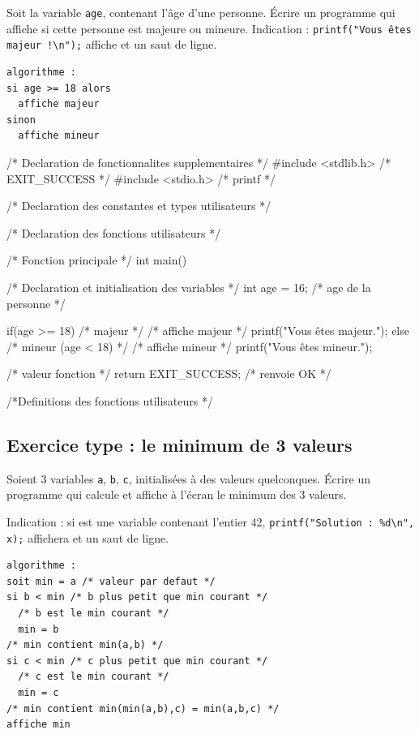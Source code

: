 Soit la variable \verb|age|, contenant l'âge d'une personne. Écrire un
programme qui affiche si cette personne est majeure ou
mineure. Indication : \verb|printf("Vous êtes majeur !\n");| affiche
 et un saut de ligne.

\begin{correction}
\begin{verbatim}
algorithme :
si age >= 18 alors 
  affiche majeur
sinon 
  affiche mineur
\end{verbatim}
\begin{listing}{1}
/* Declaration de fonctionnalites supplementaires */
#include <stdlib.h> /* EXIT_SUCCESS */
#include <stdio.h> /* printf */

/* Declaration des constantes et types utilisateurs */

/* Declaration des fonctions utilisateurs */

/* Fonction principale */
int main()
{
    /* Declaration et initialisation des variables */
    int age = 16; /* age de la personne */

    if(age >= 18) /* majeur */
    {
	/* affiche majeur */
	printf("Vous êtes majeur.\n");
    }
    else /* mineur (age < 18) */
    {
	/* affiche mineur */
	printf("Vous êtes mineur.\n");
    }
    
    /* valeur fonction */
    return EXIT_SUCCESS; /* renvoie OK */
}

/*Definitions des fonctions utilisateurs */
\end{listing}
\end{correction}

\subsection{Exercice type :  le minimum de 3 valeurs}

Soient 3 variables \verb|a|, \verb|b|, \verb|c|, initialisées à des
valeurs quelconques. Écrire un programme qui calcule et affiche à
l'écran le minimum des 3 valeurs.  

Indication : si  est une variable contenant l'entier 42,
\verb|printf("Solution : %d\n", x);| affichera  et
un saut de ligne.

\begin{correction}
\begin{verbatim}
algorithme :
soit min = a /* valeur par defaut */
si b < min /* b plus petit que min courant */
  /* b est le min courant */
  min = b
/* min contient min(a,b) */
si c < min /* c plus petit que min courant */
  /* c est le min courant */
  min = c
/* min contient min(min(a,b),c) = min(a,b,c) */
affiche min
\end{verbatim}
\begin{listing}{1}
\end{listing}
\end{correction}

